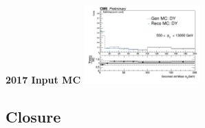 \documentclass{beamer}
\begin{document}
\begin{frame}{\textbf{2017 Input MC}}
\includegraphics[width=0.3333\textwidth]{Oct31_unfoldPlots_sdB0/InputlocalrecobinnedMC_mass_Ptbin550to13000_Detbinning_Groomingis_sdB0.png}
%


\end{frame}




\subsection{Closure}
\end{document}
